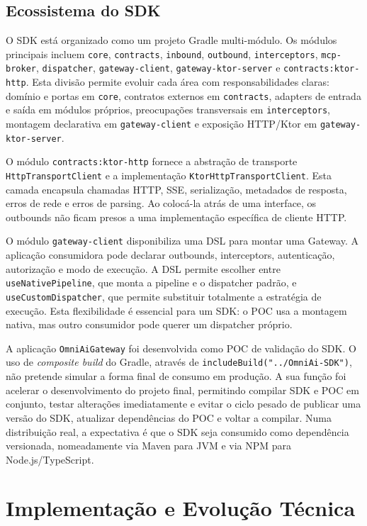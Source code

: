 \documentclass[11pt,a4paper]{report}
\begin{document}
    \section{Ecossistema do SDK}
    O SDK está organizado como um projeto Gradle multi-módulo. Os módulos principais incluem \texttt{core}, \texttt{contracts}, \texttt{inbound}, \texttt{outbound}, \texttt{interceptors}, \texttt{mcp-broker}, \texttt{dispatcher}, \texttt{gateway-client}, \texttt{gateway-ktor-server} e \texttt{contracts:ktor-http}. Esta divisão permite evoluir cada área com responsabilidades claras: domínio e portas em \texttt{core}, contratos externos em \texttt{contracts}, adapters de entrada e saída em módulos próprios, preocupações transversais em \texttt{interceptors}, montagem declarativa em \texttt{gateway-client} e exposição HTTP/Ktor em \texttt{gateway-ktor-server}.

    O módulo \texttt{contracts:ktor-http} fornece a abstração de transporte \texttt{HttpTransportClient} e a implementação \texttt{KtorHttpTransportClient}. Esta camada encapsula chamadas HTTP, SSE, serialização, metadados de resposta, erros de rede e erros de parsing. Ao colocá-la atrás de uma interface, os outbounds não ficam presos a uma implementação específica de cliente HTTP.

    O módulo \texttt{gateway-client} disponibiliza uma DSL para montar uma Gateway. A aplicação consumidora pode declarar outbounds, interceptors, autenticação, autorização e modo de execução. A DSL permite escolher entre \texttt{useNativePipeline}, que monta a pipeline e o dispatcher padrão, e \texttt{useCustomDispatcher}, que permite substituir totalmente a estratégia de execução. Esta flexibilidade é essencial para um SDK: o POC usa a montagem nativa, mas outro consumidor pode querer um dispatcher próprio.

    A aplicação \texttt{OmniAiGateway} foi desenvolvida como POC de validação do SDK. O uso de \textit{composite build} do Gradle, através de \texttt{includeBuild("../OmniAi-SDK")}, não pretende simular a forma final de consumo em produção. A sua função foi acelerar o desenvolvimento do projeto final, permitindo compilar SDK e POC em conjunto, testar alterações imediatamente e evitar o ciclo pesado de publicar uma versão do SDK, atualizar dependências do POC e voltar a compilar. Numa distribuição real, a expectativa é que o SDK seja consumido como dependência versionada, nomeadamente via Maven para JVM e via NPM para Node.js/TypeScript.

    \chapter{Implementação e Evolução Técnica}
\end{document}
